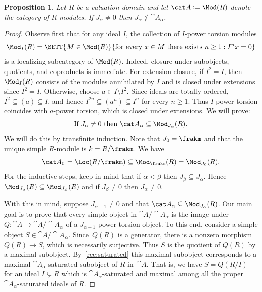 \documentclass{amsart}
\numberwithin{equation}{section}%
\newtheorem{Prop}[equation]{Proposition}
\theoremstyle{remark}
\begin{document}
\begin{Prop}\label{prop:jacobson-not-gabriel}
	Let $R$ be a valuation domain and let $\cat A\coloneqq \Mod(R)$ denote the category of $R$-modules. If $J_\alpha \neq 0$ then $J_\alpha \not\in \cat A_{\alpha}$.
\end{Prop}

\begin{proof}
	Observe first that for any ideal $I$, the collection of $I$-power torsion modules
	\[
		\Mod_I(R) = \SETT{M \in \Mod(R)}{\text{for every } x \in M \text{ there exists } n \ge 1: I^n x =0}
	\]
	is a localizing subcategory of $\Mod(R)$. Indeed, closure under subobjects, quotients, and coproducts is immediate. For extension-closure, if $I^2 = I$, then $\Mod_I(R)$ consists of the modules annihilated by $I$ and is closed under extensions since $I^2 = I$. Otherwise, choose $a \in I \setminus I^2$. Since ideals are totally ordered, $I^2 \subseteq (a) \subseteq I$, and hence $I^{2n} \subseteq (a^n) \subseteq I^n$ for every $n \ge 1$. Thus $I$-power torsion coincides with $a$-power torsion, which is closed under extensions. We will prove:
	\begin{equation}\label{eq:A-Mod-J}
		\text{If $J_\alpha \neq 0$ then $\cat A_{\alpha} \subseteq \Mod_{J_\alpha}(R)$}.
	\end{equation}
	We will do this by transfinite induction. Note that $J_0 = \frakm$ and that the unique simple $R$-module is $k=R/\frakm$. We have 
	\[
		\cat A_0 = \Loc(R/\frakm) \subseteq \Mod_{\frakm}(R) = \Mod_{J_0}(R).
	\]
	For the inductive steps, keep in mind that if $\alpha < \beta$ then $J_\beta \subseteq J_\alpha$. Hence $\Mod_{J_\alpha}(R) \subseteq \Mod_{J_\beta}(R)$ and if $J_\beta \neq 0$ then $J_\alpha \neq 0$.

	With this in mind, suppose $J_{\alpha+1} \neq 0$ and that $\cat A_{\alpha} \subseteq \Mod_{J_\alpha}(R)$. Our main goal is to prove that every simple object in $\cat A/\cat A_\alpha$ is the image under ${Q:\cat A\to \cat A/\cat A_\alpha}$ of a $J_{\alpha+1}$-power torsion object. To this end, consider a simple object $S \in \cat A/\cat A_\alpha$. Since~$Q(R)$ is a generator, there is a nonzero morphism $Q(R) \to S$, which is necessarily surjective. Thus $S$ is the quotient of $Q(R)$ by a maximal subobject. By~\cref{rec:saturated} this maximal subobject corresponds to a maximal $\cat A_\alpha$-saturated subobject of $R$ in~$\cat A$. That is, we have $S = Q(R/I)$ for an ideal $I \subsetneq R$ which is $\cat A_\alpha$-saturated and maximal among all the proper $\cat A_\alpha$-saturated ideals of $R$.


\end{proof}
\end{document}
